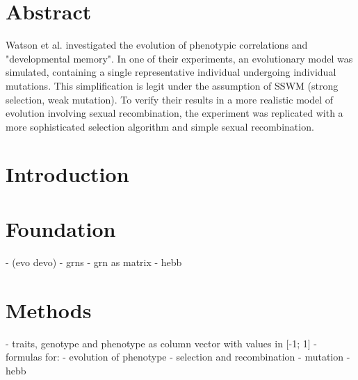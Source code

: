 \documentclass{article}
\begin{document}




\section{Abstract}

Watson et al. investigated the evolution of phenotypic correlations and "developmental memory". In one of their experiments, an evolutionary model was simulated, containing a single representative individual undergoing individual mutations. This simplification is legit under the assumption of SSWM (strong selection, weak mutation). 
To verify their results in a more realistic model of evolution involving sexual recombination, the experiment was replicated with a more sophisticated selection algorithm and simple sexual recombination.

\section{Introduction}

\section{Foundation}

- (evo devo)
- grns
- grn as matrix
- hebb


\section{Methods}

- traits, genotype and phenotype as column vector with values in [-1; 1]
- formulas for:
	- evolution of phenotype
	- selection and recombination
	- mutation
	- hebb
\end{document}

